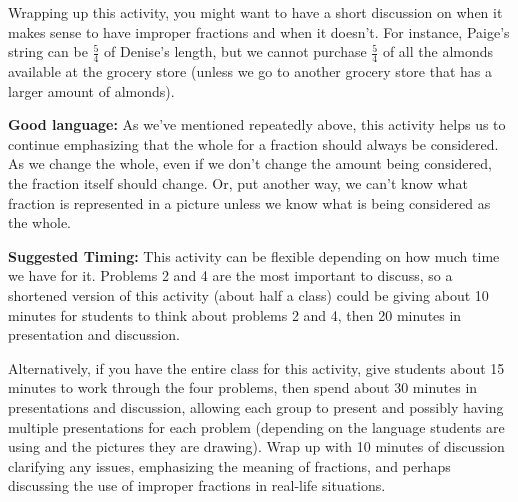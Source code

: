 \documentclass[nooutcomes, noauthor, handout]{ximera}
\begin{document}
\begin{instructorNotes}
Wrapping up this activity, you might want to have a short discussion on when it makes sense to have improper fractions and when it doesn't. For instance, Paige's string can be $\frac{5}{4}$ of Denise's length, but we cannot purchase $\frac{5}{4}$ of all the almonds available at the grocery store (unless we go to another grocery store that has a larger amount of almonds).

{\bf Good language:} As we've mentioned repeatedly above, this activity helps us to continue emphasizing that the whole for a fraction should always be considered.  As we change the whole, even if we don't change the amount being considered, the fraction itself should change.  Or, put another way, we can't know what fraction is represented in a picture unless we know what is being considered as the whole.


{\bf Suggested Timing:} This activity can be flexible depending on how much time we have for it. Problems 2 and 4 are the most important to discuss, so a shortened version of this activity (about half a class) could be giving about 10 minutes for students to think about problems 2 and 4, then 20 minutes in presentation and discussion.

Alternatively, if you have the entire class for this activity, give students about 15 minutes to work through the four problems, then spend about 30 minutes in presentations and discussion, allowing each group to present and possibly having multiple presentations for each problem (depending on the language students are using and the pictures they are drawing). Wrap up with 10 minutes of discussion clarifying any issues, emphasizing the meaning of fractions, and perhaps discussing the use of improper fractions in real-life situations.


\end{instructorNotes}
\end{document}
